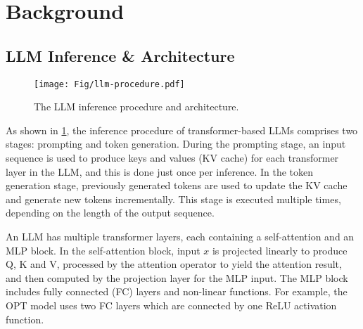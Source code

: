 \section{Background}

\subsection{LLM Inference \& Architecture}\label{sec:llm-procedure}

\begin{figure}
    \centering
    \texttt{[image: Fig/llm-procedure.pdf]}
    \vspace{-0.3cm}
    \caption{The LLM inference procedure and architecture.}
    \label{fig:llm-execution}
\vspace{-0.3cm}
\end{figure}

As shown in \fig \ref{fig:llm-execution}, the inference procedure of transformer-based LLMs comprises two stages: prompting and token generation. During the prompting stage, an input sequence is used to produce keys and values (KV cache) for each transformer layer in the LLM, and this is done just once per inference. In the token generation stage, previously generated tokens are used to update the KV cache and generate new tokens incrementally. This stage is executed multiple times, depending on the length of the output sequence. 


An LLM has multiple transformer layers, each containing a self-attention and an MLP block. In the self-attention block, input \(x\) is projected linearly to produce Q, K and V, processed by the attention operator to yield the attention result, and then computed by the projection layer for the MLP input. The MLP block includes fully connected (FC) layers and non-linear functions. For example, the OPT model uses two FC layers which are connected by one ReLU activation function. 


